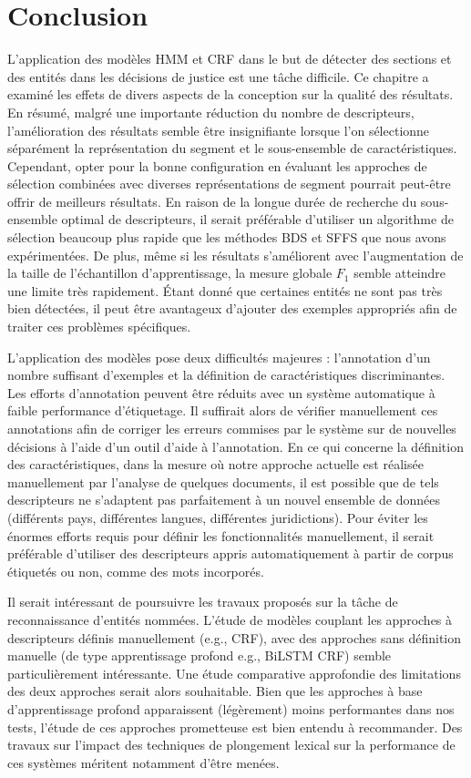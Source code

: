\section{Conclusion}
\label{sec:structuration:conclusion}
L'application des modèles HMM et CRF dans le but de détecter des sections et des entités dans les décisions de justice est une tâche difficile. Ce chapitre a examiné les effets de divers aspects de la conception sur la qualité des résultats. En résumé, malgré une importante réduction du nombre de descripteurs, l'amélioration des résultats semble être insignifiante lorsque l'on sélectionne séparément la représentation du segment et le sous-ensemble de caractéristiques. Cependant, opter pour la bonne configuration en évaluant les approches de sélection combinées avec diverses représentations de segment pourrait peut-être offrir de meilleurs résultats. En raison de la longue durée de recherche du sous-ensemble optimal de descripteurs, il serait préférable d'utiliser un algorithme de sélection beaucoup plus rapide que les méthodes BDS et SFFS que nous avons expérimentées. De plus, même si les résultats s'améliorent avec l'augmentation de la taille de l'échantillon d'apprentissage, la mesure globale $F_1$ semble atteindre une limite très rapidement. Étant donné que certaines entités ne sont pas très bien détectées, il peut être avantageux d'ajouter des exemples appropriés afin de traiter ces problèmes spécifiques.

L'application des modèles pose deux difficultés majeures : l'annotation d'un nombre suffisant d'exemples et la définition de caractéristiques discriminantes. Les efforts d'annotation peuvent être réduits avec un système automatique à faible performance d'étiquetage. Il suffirait alors de vérifier manuellement ces annotations afin de corriger les erreurs commises par le système sur de nouvelles décisions à l'aide d'un outil d'aide à l'annotation. En ce qui concerne la définition des caractéristiques, dans la mesure où notre approche actuelle est réalisée manuellement par l'analyse de quelques documents, il est possible que de tels descripteurs ne s'adaptent pas parfaitement à un nouvel ensemble de données (différents pays, différentes langues, différentes juridictions). Pour éviter les énormes efforts requis pour définir les fonctionnalités manuellement, il serait préférable d'utiliser des descripteurs appris automatiquement à partir de corpus étiquetés ou non, comme des mots incorporés.

Il serait intéressant de poursuivre les travaux proposés sur la tâche de reconnaissance d'entités nommées. L'étude de modèles couplant les approches à descripteurs définis manuellement (e.g., CRF), avec des approches sans définition manuelle (de type apprentissage profond e.g., BiLSTM CRF) semble particulièrement intéressante. Une étude comparative approfondie des limitations des deux approches serait alors souhaitable. Bien que les approches à base d'apprentissage profond apparaissent (légèrement) moins performantes dans nos tests, l'étude de ces approches prometteuse est bien entendu à recommander. Des travaux sur l'impact des techniques de plongement lexical sur la performance de ces systèmes méritent notamment d'être menées.

